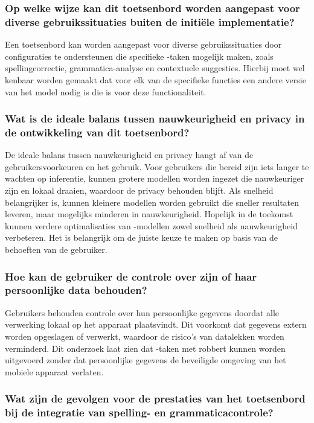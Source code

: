 \subsubsection{Op welke wijze kan dit toetsenbord worden aangepast voor diverse gebruikssituaties buiten de initiële implementatie?}

Een toetsenbord kan worden aangepast voor diverse gebruikssituaties door configuraties te ondersteunen die specifieke -taken mogelijk maken, zoals spellingcorrectie, grammatica-analyse en contextuele suggesties. Hierbij moet wel kenbaar worden gemaakt dat voor elk van de specifieke functies een andere versie van het model nodig is die \gefinetuned is voor deze functionaliteit.

\subsubsection{Wat is de ideale balans tussen nauwkeurigheid en privacy in de ontwikkeling van dit toetsenbord?}

De ideale balans tussen nauwkeurigheid en privacy hangt af van de gebruikersvoorkeuren en het gebruik. Voor gebruikers die bereid zijn iets langer te wachten op inferentie, kunnen grotere modellen worden ingezet die nauwkeuriger zijn en lokaal draaien, waardoor de privacy behouden blijft. Als snelheid belangrijker is, kunnen kleinere modellen worden gebruikt die sneller resultaten leveren, maar mogelijks minderen in nauwkeurigheid. Hopelijk in de toekomst kunnen verdere optimalisaties van -modellen zowel snelheid als nauwkeurigheid verbeteren. Het is belangrijk om de juiste keuze te maken op basis van de behoeften van de gebruiker.

\subsubsection{Hoe kan de gebruiker de controle over zijn of haar persoonlijke data behouden?}

Gebruikers behouden controle over hun persoonlijke gegevens doordat alle verwerking lokaal op het apparaat plaatsvindt. Dit voorkomt dat gegevens extern worden opgeslagen of verwerkt, waardoor de risico's van datalekken worden verminderd. Dit onderzoek laat zien dat -taken met \gls{robbert} kunnen worden uitgevoerd zonder dat persoonlijke gegevens de beveiligde omgeving van het mobiele apparaat verlaten.

\subsubsection{Wat zijn de gevolgen voor de prestaties van het toetsenbord bij de integratie van spelling- en grammaticacontrole?}

